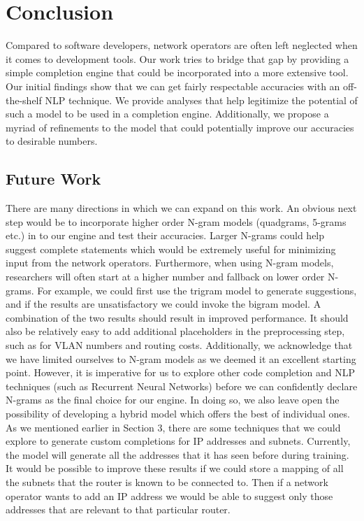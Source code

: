 \documentclass[../thesis.tex]{subfiles}
\begin{document}
\chapter{Conclusion}
\label{ch:conclusion}

Compared to software developers, network operators are often left neglected when it comes to development tools. Our work tries to bridge that gap by providing a simple completion engine that could be incorporated into a more extensive tool. Our initial findings show that we can get fairly respectable accuracies with an off-the-shelf NLP technique. We provide analyses that help legitimize the potential of such a model to be used in a completion engine. Additionally, we propose a myriad of refinements to the model that could potentially improve our accuracies to desirable numbers.

\section{Future Work}
There are many directions in which we can expand on this work. An obvious next step would be to incorporate higher order N-gram models (quadgrams, 5-grams etc.) in to our engine and test their accuracies. Larger N-grams could help suggest complete statements which would be extremely useful for minimizing input from the network operators. Furthermore, when using N-gram models, researchers will often start at a higher number and fallback on lower order N-grams. For example, we could first use the trigram model to generate suggestions, and if the results are unsatisfactory we could invoke the bigram model. A combination of the two results should result in improved performance. It should also be relatively easy to add additional placeholders in the preprocessing step, such as for VLAN numbers and routing costs. Additionally, we acknowledge that we have limited ourselves to N-gram models as we deemed it an excellent starting point. However, it is imperative for us to explore other code completion and NLP techniques (such as Recurrent Neural Networks) before we can confidently declare N-grams as the final choice for our engine. In doing so, we also leave open the possibility of developing a hybrid model which offers the best of individual ones.\\

As we mentioned earlier in Section 3, there are some techniques that we could explore to generate custom completions for IP addresses and subnets. Currently, the model will generate all the addresses that it has seen before during training. It would be possible to improve these results if we could store a mapping of all the subnets that the router is known to be connected to. Then if a network operator wants to add an IP address we would be able to suggest only those addresses that are relevant to that particular router.\\
\end{document}
